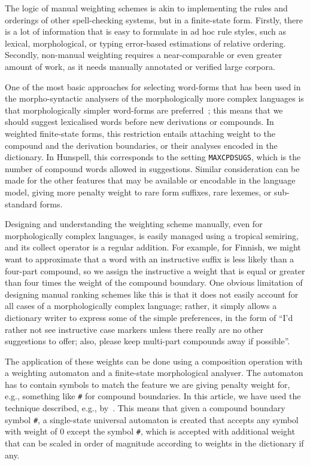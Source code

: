 \documentclass[a4paper,12pt]{article}
\begin{document}
The logic of manual weighting schemes is akin to implementing the rules and
orderings of other spell-checking systems, but in a finite-state form. Firstly, there is a lot of information that
is easy to formulate in ad hoc rule styles, such as lexical, morphological, or
typing error-based estimations of relative ordering. Secondly, non-manual
weighting requires a near-comparable or even greater amount of work, as it needs
manually annotated or verified large corpora.

One of the most basic approaches for selecting word-forms that has been used in the
morpho-syntactic analysers of the morphologically more complex languages is
that morphologically simpler word-forms are
preferred~\cite[]{karlsson1992swetwol}; this means that we should suggest
lexicalised words before new derivations or compounds. In weighted
finite-state forms, this restriction entails attaching weight to the compound and the
derivation boundaries, or their analyses encoded in the dictionary.
In Hunspell, this corresponds to the setting \texttt{MAXCPDSUGS}, which is
the number of compound words allowed in suggestions. Similar
consideration can be made for the other features that may be available or
encodable in the language model, giving more penalty weight to rare form
suffixes, rare lexemes, or sub-standard forms.

Designing and understanding the weighting scheme manually, even for
morphologically complex languages, is easily managed using a tropical
semiring, and its collect operator is a regular addition. For example, for
Finnish,  we might want to approximate that a word with an instructive suffix is less likely
than a four-part compound, so we assign the instructive a weight that is equal or
greater than four times the weight of the compound boundary. One obvious limitation
of designing manual ranking schemes like this is that it does not easily
account for all cases of a morphologically complex language; rather, it simply 
allows a dictionary writer to express some of the simple preferences, in the form
of  ``I'd rather not see instructive case markers unless there really are no other
suggestions to offer; also, please keep multi-part compounds away if possible''.

The application of these weights can be done using a composition operation with
a weighting automaton and a finite-state morphological analyser. The automaton
has to contain symbols to match the feature we are giving penalty weight for,
e.g., something like \texttt{\#} for compound boundaries. In this article, we have used the technique described, e.g.,
by~\cite{linden/2009/fsmnlp}. This means that given a compound boundary symbol
\texttt{\#}, a single-state universal automaton is created that accepts any
symbol with weight of $0$ except the symbol \texttt{\#}, which is accepted with
additional weight that can be scaled in order of magnitude according to
weights in the dictionary if any.
\end{document}
